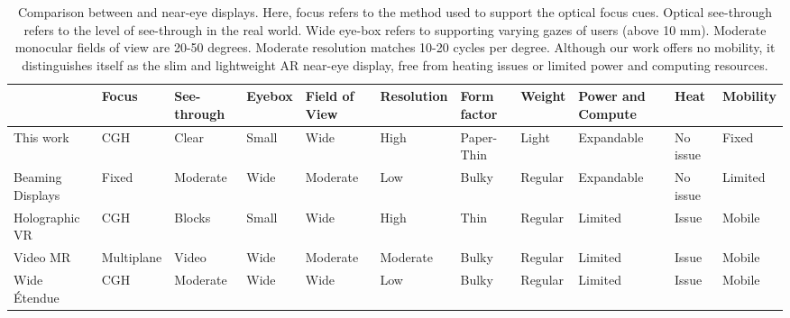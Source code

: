 \documentclass{vgtc}                          %
\newcommand{\high}[1]{{\cellcolor{green!25} #1}}
\newcommand{\medium}[1]{\cellcolor{yellow!25} #1}
\newcommand{\low}[1]{\cellcolor{red!25} #1}
\begin{document}
\begin{table*}[ht!]
  \caption{
Comparison between \AR and \VR near-eye displays. Here, focus refers to the method used to support the optical focus cues. Optical see-through refers to the level of see-through in the real world. Wide eye-box refers to supporting varying gazes of users (above 10 mm). Moderate monocular fields of view are 20-50 degrees. Moderate resolution matches 10-20 cycles per degree. Although our work offers no mobility, it distinguishes itself as the slim and lightweight AR near-eye display, free from heating issues or limited power and computing resources.
         }
  \label{tbl:comparison}
  \begin{tabular}{m{2.9cm} m{1.2cm} m{1.0cm} m{0.6cm} m{1.0cm} m{1.0cm} m{1.43cm} m{0.82cm} m{1.3cm} m{1.1cm} m{0.8cm}}
    \toprule
	  & Focus & See-through & Eyebox & Field of View & Resolution & Form factor & Weight & Power and Compute & Heat & Mobility\\
    \midrule


          This work & 
          \high{CGH} & 
          \high{Clear} & 
          \low{Small} &
          \high{Wide} & 
          \high{High} & 
          \high{Paper-Thin} & 
          \high{Light} & 
          \high{Expandable} & 
          \high{No issue} &
          \low{Fixed}
          \\ \hline


	  Beaming Displays \cite{itoh2021beaming} & 
	  \low{Fixed} & 
	  \medium{Moderate} & 
          \high{Wide} &
	  \medium{Moderate} & 
	  \low{Low} & 
	  \low{Bulky} & 
	  \low{Regular} & 
	  \high{Expandable} & 
	  \high{No issue} &
	  \medium{Limited}
	  \\ \hline


	  Holographic VR \cite{kim2022holographicglasses}& 
	  \high{CGH} & 
	  \low{Blocks} & 
	  \low{Small} &
	  \high{Wide} & 
	  \high{High} & 
	  \medium{Thin} & 
	  \low{Regular} & 
	  \low{Limited} & 
	  \low{Issue} &
	  \high{Mobile}
	  \\ \hline


	  Video MR \cite{ebner2022video}& 
	  \high{Multiplane} & 
	  \medium{Video} & 
	  \high{Wide} &
	  \medium{Moderate} & 
	  \medium{Moderate} & 
	  \low{Bulky} & 
	  \low{Regular} & 
	  \low{Limited} & 
	  \low{Issue} &
	  \high{Mobile}
	  \\ \hline


	  Wide Étendue \cite{kuo2020high} & 
	  \high{CGH} & 
	  \medium{Moderate} & 
	  \high{Wide} &
	  \high{Wide} & 
          \low{Low} & 
	  \low{Bulky} & 
	  \low{Regular} & 
	  \low{Limited} & 
	  \low{Issue} &
	  \high{Mobile}
	  \\ \hline



\end{tabular}
\end{table*}
\end{document}

